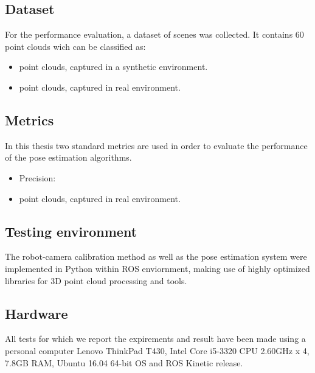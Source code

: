 \subsection{Dataset}

For the performance evaluation, a dataset of scenes was collected. It contains 60 point clouds wich can be classified as:
\begin{itemize}
\item point clouds, captured in a synthetic environment.
\item point clouds, captured in real environment. 
\end{itemize}

\subsection{Metrics}
In this thesis two standard metrics are used in order to evaluate the performance of the pose estimation algorithms.
\begin{itemize}
\item Precision:
\item point clouds, captured in real environment. 
\end{itemize}

\subsection{Testing environment}
The robot-camera calibration method as well as the pose estimation system were implemented in Python within ROS enviornment, making use of highly optimized libraries for 3D point cloud processing and tools. 

\subsection{Hardware}
All tests for which we report the expirements and result have been made using a personal computer Lenovo ThinkPad T430, Intel Core i5-3320 CPU 2.60GHz x 4, 7.8GB RAM, Ubuntu 16.04 64-bit OS
and ROS Kinetic release.

\fi
